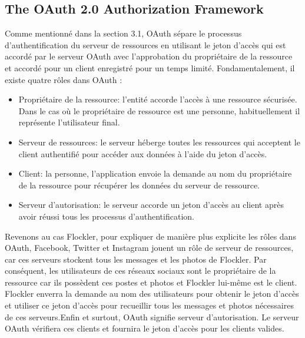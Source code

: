\subsection{The OAuth 2.0 Authorization Framework}

Comme mentionné dans la section 3.1, OAuth sépare le processus d'authentification du serveur de ressources en utilisant le jeton d'accès qui est accordé par le serveur OAuth avec l'approbation du propriétaire de la ressource et accordé pour un client enregistré pour un temps limité. Fondamentalement, il existe quatre rôles dans OAuth \cite{4}:
\begin{itemize}
\item Propriétaire de la ressource: l'entité accorde l'accès à une ressource sécurisée. Dans le cas où le propriétaire de ressource est une personne, habituellement il représente l'utilisateur final.
\item Serveur de ressources: le serveur héberge toutes les ressources qui acceptent le client authentifié pour accéder aux données à l'aide du jeton d'accès.
\item Client: la personne, l'application envoie la demande au nom du propriétaire de la ressource pour récupérer les données du serveur de ressource.
\item Serveur d'autorisation: le serveur accorde un jeton d'accès au client après avoir réussi tous les processus d'authentification.
\end{itemize}
Revenons au cas Flockler,  pour expliquer de manière plus explicite les rôles dans OAuth, Facebook, Twitter et Instagram jouent un rôle de serveur de ressources, car ces serveurs stockent tous les messages et les photos de Flockler. Par conséquent, les utilisateurs de ces réseaux sociaux sont le propriétaire de la ressource car ils possèdent ces postes et photos et Flockler lui-même est le client. Flockler enverra la demande au nom des utilisateurs  pour obtenir le jeton d'accès et utiliser ce jeton d'accès pour recueillir tous les messages et photos nécessaires de ces serveurs.Enfin et surtout, OAuth signifie serveur d'autorisation. Le serveur OAuth vérifiera ces clients et fournira le jeton d'accès pour les clients valides.

